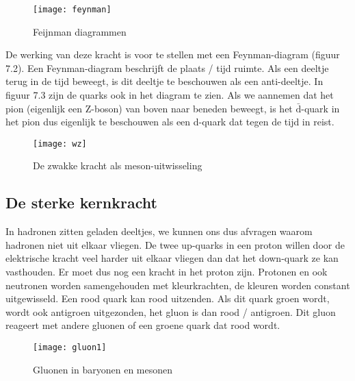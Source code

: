 \begin{figure}
\noindent \begin{centering}
\texttt{[image: feynman]}
\par\end{centering}

\caption{Feijnman diagrammen}
\end{figure}


De werking van deze kracht is voor te stellen met een Feynman-diagram
(figuur 7.2). Een Feynman-diagram beschrijft de plaats / tijd ruimte.
Als een deeltje terug in de tijd beweegt, is dit deeltje te beschouwen
als een anti-deeltje. In figuur 7.3 zijn de quarks ook in het diagram
te zien. Als we aannemen dat het pion (eigenlijk een Z-boson) van
boven naar beneden beweegt, is het $\bar{\mathrm{d}}$-quark in het
pion dus eigenlijk te beschouwen als een d-quark dat tegen de tijd
in reist. 

\begin{figure}[h]
\noindent \begin{centering}
\texttt{[image: wz]}
\par\end{centering}

\caption{De zwakke kracht als meson-uitwisseling}
\end{figure}


\subsection{De sterke kernkracht}

In hadronen zitten geladen deeltjes, we kunnen ons dus afvragen waarom
hadronen niet uit elkaar vliegen. De twee up-quarks in een proton
willen door de elektrische kracht veel harder uit elkaar vliegen dan
dat het down-quark ze kan vasthouden. Er moet dus nog een kracht in
het proton zijn. Protonen en ook neutronen worden samengehouden met
kleurkrachten, de kleuren worden constant uitgewisseld. Een rood quark
kan rood uitzenden. Als dit quark groen wordt, wordt ook antigroen
uit\-gezonden, het gluon is dan rood / antigroen. Dit gluon reageert
met andere gluonen of een groene quark dat rood wordt.

\begin{figure}[H]
\noindent \begin{centering}
\texttt{[image: gluon1]}
\par\end{centering}

\caption{Gluonen in baryonen en mesonen}
\end{figure}



